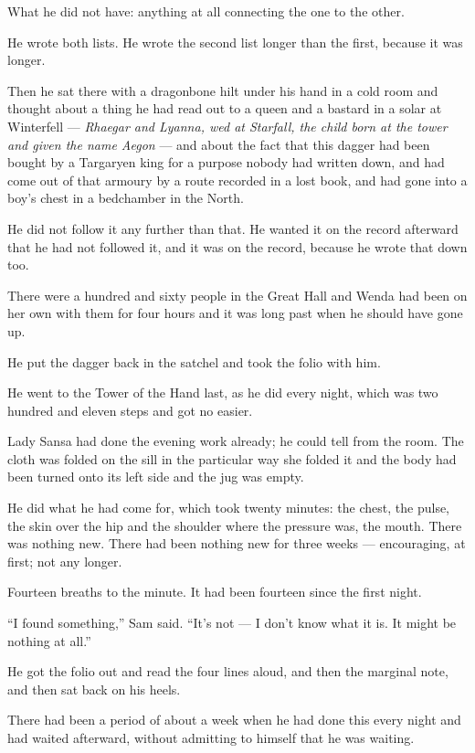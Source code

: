 What he did not have: anything at all connecting the one to the other.

He wrote both lists. He wrote the second list longer than the first, because it was longer.

Then he sat there with a dragonbone hilt under his hand in a cold room and thought about a thing he had read out to a queen and a bastard in a solar at Winterfell — \textit{Rhaegar and Lyanna, wed at Starfall, the child born at the tower and given the name Aegon} — and about the fact that this dagger had been bought by a Targaryen king for a purpose nobody had written down, and had come out of that armoury by a route recorded in a lost book, and had gone into a boy’s chest in a bedchamber in the North.

He did not follow it any further than that. He wanted it on the record afterward that he had not followed it, and it was on the record, because he wrote that down too.

There were a hundred and sixty people in the Great Hall and Wenda had been on her own with them for four hours and it was long past when he should have gone up.

He put the dagger back in the satchel and took the folio with him.

\sceneBreak

He went to the Tower of the Hand last, as he did every night, which was two hundred and eleven steps and got no easier.

Lady Sansa had done the evening work already; he could tell from the room. The cloth was folded on the sill in the particular way she folded it and the body had been turned onto its left side and the jug was empty.

He did what he had come for, which took twenty minutes: the chest, the pulse, the skin over the hip and the shoulder where the pressure was, the mouth. There was nothing new. There had been nothing new for three weeks — encouraging, at first; not any longer.

Fourteen breaths to the minute. It had been fourteen since the first night.

“I found something,” Sam said. “It’s not — I don’t know what it is. It might be nothing at all.”

He got the folio out and read the four lines aloud, and then the marginal note, and then sat back on his heels.

There had been a period of about a week when he had done this every night and had waited afterward, without admitting to himself that he was waiting.

